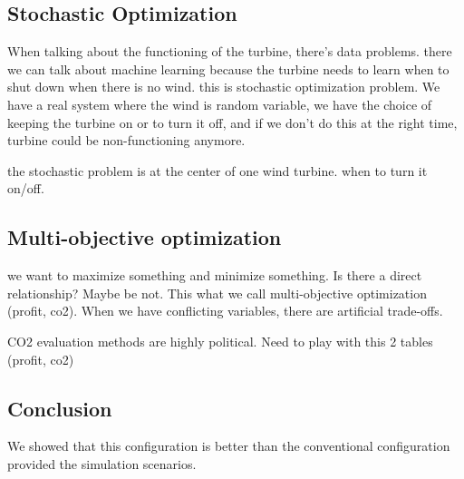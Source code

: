 \documentclass[12pt]{article}
\begin{document}
\subsection{Stochastic Optimization}
When talking about the functioning of the turbine, there's data problems.
there we can talk about machine learning because the turbine needs to learn when to shut down when there is no wind. this is stochastic optimization problem. We have a real 
system where the wind is random variable, we have the choice of keeping the turbine on or to turn it off, and if we don't do this at the right time, turbine could be non-functioning anymore. 

the stochastic problem is at the center of one wind turbine. when to turn it on/off.

\subsection{Multi-objective optimization}
we want to maximize something and minimize something. Is there a direct relationship?
Maybe be not. This what we call multi-objective optimization (profit, co2). When we have conflicting variables, there are artificial trade-offs. 

CO2 evaluation methods are highly political. Need to play with this 2 tables (profit, co2)

\subsection{Conclusion}
We showed that this configuration is better than the conventional configuration provided the simulation scenarios. 
\end{document}
